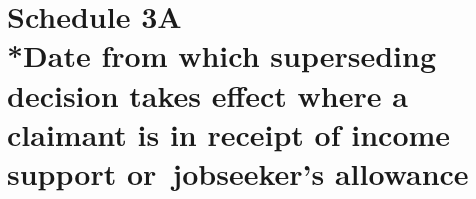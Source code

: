 \documentclass[12pt,a4paper]{article}
\begin{document}
%
%
%
%
%
%
%
%
%
%
%
%
%

\part[Schedule 3A --- Date 
from which superseding decision takes effect  %
where a claimant is in receipt of income support or~jobseeker’s allowance]{Schedule 3A\\*Date 
from which superseding decision takes effect  %
where a claimant is in receipt of income support or~jobseeker’s allowance}
\end{document}
